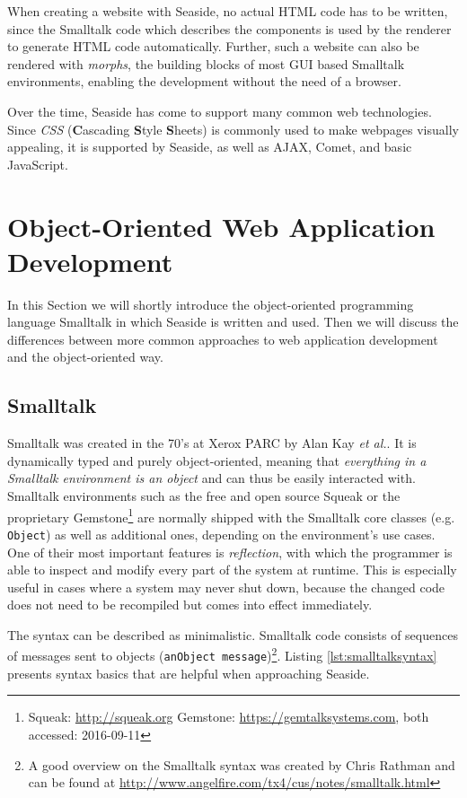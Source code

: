 \documentclass[a4paper,12pt,pagesize,headsepline,oribibl,titlepage]{scrartcl}
\begin{document}
When creating a website with Seaside, no actual HTML code has to be written, since the Smalltalk code which describes the components is used by the renderer to generate HTML code automatically. Further, such a website can also be rendered with \emph{morphs}, the building blocks of most GUI based Smalltalk environments, enabling the development without the need of a browser. 

Over the time, Seaside has come to support many common web technologies. Since \emph{CSS} (\textbf{C}ascading \textbf{S}tyle \textbf{S}heets) is commonly used to make webpages visually  appealing, it is supported by Seaside, as well as AJAX, Comet, and basic JavaScript.


\section{Object-Oriented Web Application Development}
\label{sec:oowad} 

In this Section we will shortly introduce the object-oriented programming language Smalltalk in which Seaside is written and used. Then we will discuss the differences between more common approaches to web application development and the object-oriented way.

\subsection{Smalltalk}

Smalltalk was created in the 70's at Xerox PARC by Alan Kay \emph{et al.}. It is dynamically typed and purely object-oriented, meaning that \emph{everything in a Smalltalk environment is an object} and can thus be easily interacted with. Smalltalk environments such as the free and open source Squeak or the proprietary Gemstone\footnote{Squeak: \url{http://squeak.org} Gemstone: \url{https://gemtalksystems.com}, both accessed: 2016-09-11} are normally shipped with the Smalltalk core classes (e.g. \texttt{Object}) as well as additional ones, depending on the environment's use cases. One of their most important features is \emph{reflection}, with which the programmer is able to inspect and modify every part of the system at runtime. This is especially useful in cases where a system may never shut down, because the changed code does not need to be recompiled but comes into effect immediately. 

The syntax can be described as minimalistic. Smalltalk code consists of sequences of messages sent to objects (\texttt{anObject message})\footnote{A good overview on the Smalltalk syntax was created by Chris Rathman and can be found at \url{http://www.angelfire.com/tx4/cus/notes/smalltalk.html}}. Listing \ref{lst:smalltalksyntax} presents syntax basics that are helpful when approaching Seaside.  
\end{document}
